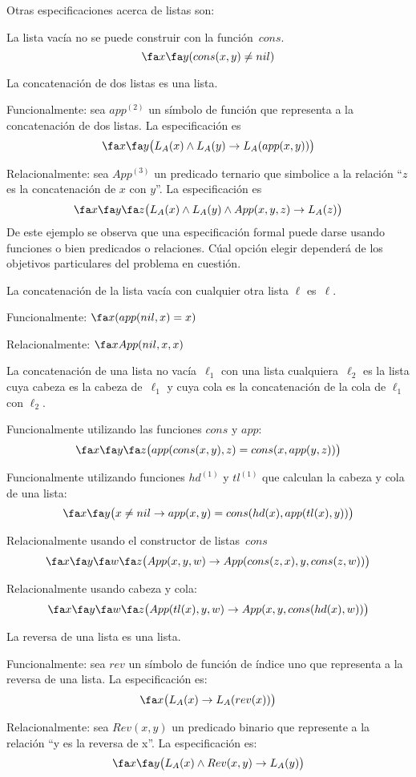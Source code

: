 \documentclass[11pt,letterpaper]{article}
\begin{document}
\noindent Otras especificaciones acerca de listas son:
\bi
 \item La lista vacía no se puede construir con la función~$cons$. 
 $$ \fa x \fa y (cons(x,y)\neq nil)$$

 \item La concatenación de dos listas es una lista.
  \bi
   \item Funcionalmente: sea $app^{(2)}$ un símbolo de función que
    representa a la concatenación de dos listas. La especificación es
    $$ \fa x\fa y \big(L_A(x)\land L_A(y)\to L_A(app(x,y))\big)$$ 
   \item Relacionalmente: sea $App^{(3)}$ un predicado ternario
    que simbolice a la relación 
    \enquote{$z$ es la concatenación de $x$ con $y$}. La especificación es
    $$\fa x \fa y \fa z\big(L_A(x)\land L_A(y)\land App(x,y,z)\to L_A(z)\big)$$
   \ei
De este ejemplo se observa que una especificación formal puede darse usando 
funciones o bien predicados o relaciones. Cúal opción elegir dependerá de los 
objetivos particulares del problema en cuestión. 

 \item La concatenación de la lista vacía con cualquier otra lista $\ell$ 
  es~$\ell$.
  \bi
   \item Funcionalmente: $ \fa x (app(nil,x)=x) $
   \item Relacionalmente: $ \fa x App(nil,x,x)$
  \ei

 \item La concatenación de una lista no vacía~$\ell_1$ con una lista
  cualquiera~$\ell_2$ es la lista cuya cabeza es la cabeza de~$\ell_1$ y cuya 
  cola es la concatenación de la cola de $\ell_1$ con $\ell_2$.
 \bi
  \item Funcionalmente utilizando las funciones $cons$ y $app$:
    $$ \fa x\fa y\fa z \big(app(cons(x,y),z) = cons(x,app(y,z))\big)$$
  \item Funcionalmente utilizando funciones $hd^{(1)}$ y $tl^{(1)}$ que 
   calculan la cabeza y cola de una lista:
    $$\fa x\fa y\big(x\neq nil \to app(x,y)=cons(hd(x),app(tl(x),y))\big)$$
  \item Relacionalmente usando el constructor de listas~$cons$
    $$\fa x\fa y\fa w\fa z\big(App(x,y,w)\to App(cons(z,x),y,cons(z,w))\big)$$
  \item Relacionalmente usando cabeza y cola:
    $$\fa x\fa y\fa w\fa z\big(App(tl(x),y,w)\to App(x,y,cons(hd(x),w))\big)$$
 \ei

 \item La reversa de una lista es una lista.
 \bi
  \item Funcionalmente: sea $rev$ un símbolo de función de índice uno
  que representa a la reversa de una lista. La especificación es:
    $$ \fa x \big(L_A(x)\to L_A(rev(x))\big) $$
  \item Relacionalmente: sea $Rev(x,y)$ un predicado binario que represente
  a la relación \enquote{y es la reversa de x}. La especificación es:
    $$\fa x \fa y\big(L_A(x)\land Rev(x,y)\to L_A(y)\big)$$
 \ei
\end{document}
